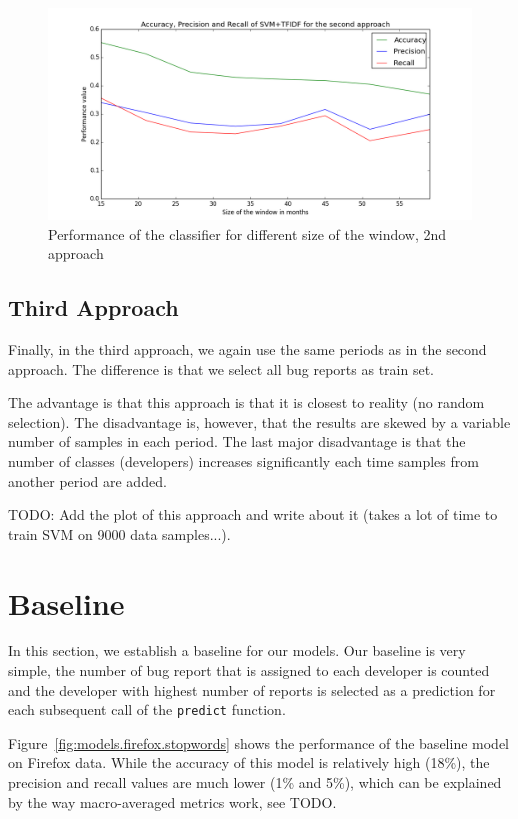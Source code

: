 \begin{figure}[htbp]
    \centering
        \includegraphics[width=\textwidth]{./images/window_size/firefox_2a.png}
    \caption{Performance of the classifier for different size of the window, 2nd approach}
    \label{fig:window.firefox.2a}
\end{figure}

\subsection{Third Approach}

Finally, in the third approach, we again use the same periods as in the second approach. The difference is that we select all bug reports as train set.

The advantage is that this approach is that it is closest to reality (no random selection). The disadvantage is, however, that the results are skewed by a variable number of samples in each period. The last major disadvantage is that the number of classes (developers) increases significantly each time samples from another period are added.

TODO: Add the plot of this approach and write about it (takes a lot of time to train SVM on 9000 data samples...).

\section{Baseline}

In this section, we establish a baseline for our models. Our baseline is very simple, the number of bug report that is assigned to each developer is counted and the developer with highest number of reports is selected as a prediction for each subsequent call of the \texttt{predict} function.

Figure~\ref{fig:models.firefox.stopwords} shows the performance of the baseline model on Firefox data. While the accuracy of this model is relatively high (18\%), the precision and recall values are much lower (1\% and 5\%), which can be explained by the way macro-averaged metrics work, see TODO. 

